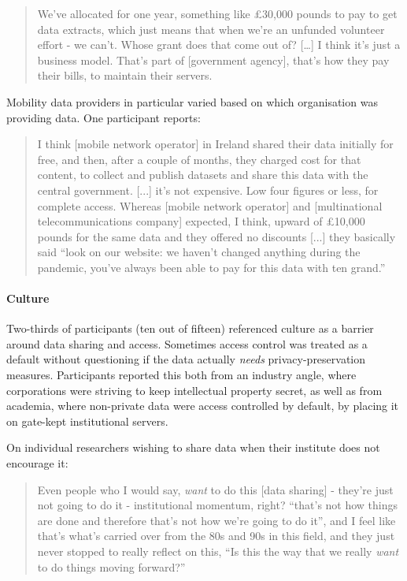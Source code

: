 \documentclass{CUP-JNL-DAP}%
\begin{document}
\blockquote{We've allocated for one year, something like £30,000 pounds to pay to get data extracts, which just means that when we're an unfunded volunteer effort - we can't. Whose grant does that come out of? […] I think it's just a business model. That's part of [government agency], that's how they pay their bills, to maintain their servers.}

Mobility data providers in particular varied based on which organisation was providing data. One participant reports:  

\blockquote{I think [mobile network operator] in Ireland shared their data initially for free, and then, after a couple of months, they charged cost for that content, to collect and publish datasets and share this data with the central government. [...] it's not expensive. Low four figures or less, for complete access. Whereas [mobile network operator] and [multinational telecommunications company] expected, I think, upward of £10,000 pounds for the same data and they offered no discounts [...] they basically said \enquote{look on our website: we haven't changed anything during the pandemic, you've always been able to pay for this data with ten grand.}}

\paragraph{Culture} 
Two-thirds of participants (ten out of fifteen) referenced culture as a barrier around data sharing and access. Sometimes access control was treated as a default without questioning if the data actually \textit{needs} privacy-preservation measures. Participants reported this both from an industry angle, where corporations were striving to keep intellectual property secret, as well as from academia, where non-private data were access controlled by default, by placing it on gate-kept institutional servers.


On individual researchers wishing to share data when their institute does not encourage it: 

\blockquote{Even people who I would say, \textit{want} to do this [data sharing] - they're just not going to do it - institutional momentum, right? \enquote{that's not how things are done and therefore that's not how we're going to do it}, and I feel like that's what's carried over from the 80s and 90s in this field, and they just never stopped to really reflect on this, \enquote{Is this the way that we really \textit{want} to do things moving forward?}}
\end{document}
